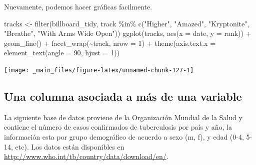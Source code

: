 \documentclass[
]{book}
\newenvironment{Shaded}{\begin{snugshade}}{\end{snugshade}}
\newcommand{\AttributeTok}[1]{\textcolor[rgb]{0.77,0.63,0.00}{#1}}
\newcommand{\DecValTok}[1]{\textcolor[rgb]{0.00,0.00,0.81}{#1}}
\newcommand{\FunctionTok}[1]{\textcolor[rgb]{0.00,0.00,0.00}{#1}}
\newcommand{\NormalTok}[1]{#1}
\newcommand{\OtherTok}[1]{\textcolor[rgb]{0.56,0.35,0.01}{#1}}
\newcommand{\SpecialCharTok}[1]{\textcolor[rgb]{0.00,0.00,0.00}{#1}}
\newcommand{\StringTok}[1]{\textcolor[rgb]{0.31,0.60,0.02}{#1}}
\begin{document}
Nuevamente, podemos hacer gráficas facilmente.

\begin{Shaded}
\begin{Highlighting}[]
\NormalTok{tracks }\OtherTok{\textless{}{-}} \FunctionTok{filter}\NormalTok{(billboard\_tidy, track }\SpecialCharTok{\%in\%} 
    \FunctionTok{c}\NormalTok{(}\StringTok{"Higher"}\NormalTok{, }\StringTok{"Amazed"}\NormalTok{, }\StringTok{"Kryptonite"}\NormalTok{, }\StringTok{"Breathe"}\NormalTok{, }\StringTok{"With Arms Wide Open"}\NormalTok{))}
\FunctionTok{ggplot}\NormalTok{(tracks, }\FunctionTok{aes}\NormalTok{(}\AttributeTok{x =}\NormalTok{ date, }\AttributeTok{y =}\NormalTok{ rank)) }\SpecialCharTok{+}
  \FunctionTok{geom\_line}\NormalTok{() }\SpecialCharTok{+} 
  \FunctionTok{facet\_wrap}\NormalTok{(}\SpecialCharTok{\textasciitilde{}}\NormalTok{track, }\AttributeTok{nrow =} \DecValTok{1}\NormalTok{) }\SpecialCharTok{+} 
  \FunctionTok{theme}\NormalTok{(}\AttributeTok{axis.text.x =} \FunctionTok{element\_text}\NormalTok{(}\AttributeTok{angle =} \DecValTok{90}\NormalTok{, }\AttributeTok{hjust =} \DecValTok{1}\NormalTok{))}
\end{Highlighting}
\end{Shaded}

\begin{center}\texttt{[image: \_main\_files/figure-latex/unnamed-chunk-127-1]} \end{center}

\hypertarget{una-columna-asociada-a-muxe1s-de-una-variable}{%
\subsection*{Una columna asociada a más de una variable}\label{una-columna-asociada-a-muxe1s-de-una-variable}}

La siguiente base de datos proviene de la Organización Mundial de la Salud y
contiene el número de casos confirmados de tuberculosis por país y año, la
información esta por grupo demográfico de acuerdo a sexo (m, f), y edad (0-4,
5-14, etc). Los datos están disponibles en \url{http://www.who.int/tb/country/data/download/en/}.
\end{document}
